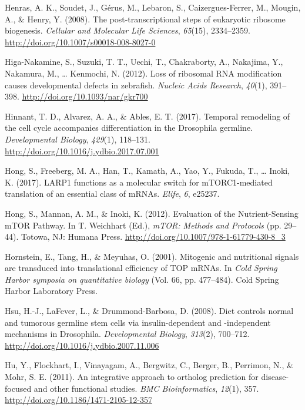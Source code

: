 \documentclass[12pt,twoside]{reedthesis}
\newlength{\cslhangindent}
\newenvironment{cslreferences}%
  {\setlength{\parindent}{0pt}%
  \everypar{\setlength{\hangindent}{\cslhangindent}}\ignorespaces}%
  {\par}
\begin{document}
\begin{cslreferences}
\leavevmode\hypertarget{ref-Henras2008c}{}%
Henras, A. K., Soudet, J., Gérus, M., Lebaron, S., Caizergues-Ferrer, M., Mougin, A., \& Henry, Y. (2008). The post-transcriptional steps of eukaryotic ribosome biogenesis. \emph{Cellular and Molecular Life Sciences}, \emph{65}(15), 2334--2359. \url{http://doi.org/10.1007/s00018-008-8027-0}

\leavevmode\hypertarget{ref-Higa-Nakamine2012o}{}%
Higa-Nakamine, S., Suzuki, T. T., Uechi, T., Chakraborty, A., Nakajima, Y., Nakamura, M., \ldots{} Kenmochi, N. (2012). Loss of ribosomal RNA modification causes developmental defects in zebrafish. \emph{Nucleic Acids Research}, \emph{40}(1), 391--398. \url{http://doi.org/10.1093/nar/gkr700}

\leavevmode\hypertarget{ref-hinnantTemporalRemodelingCell2017}{}%
Hinnant, T. D., Alvarez, A. A., \& Ables, E. T. (2017). Temporal remodeling of the cell cycle accompanies differentiation in the Drosophila germline. \emph{Developmental Biology}, \emph{429}(1), 118--131. \url{http://doi.org/10.1016/j.ydbio.2017.07.001}

\leavevmode\hypertarget{ref-Hong2017a}{}%
Hong, S., Freeberg, M. A., Han, T., Kamath, A., Yao, Y., Fukuda, T., \ldots{} Inoki, K. (2017). LARP1 functions as a molecular switch for mTORC1-mediated translation of an essential class of mRNAs. \emph{Elife}, \emph{6}, e25237.

\leavevmode\hypertarget{ref-hongEvaluationNutrientSensingMTOR2012}{}%
Hong, S., Mannan, A. M., \& Inoki, K. (2012). Evaluation of the Nutrient-Sensing mTOR Pathway. In T. Weichhart (Ed.), \emph{mTOR: Methods and Protocols} (pp. 29--44). Totowa, NJ: Humana Press. \url{http://doi.org/10.1007/978-1-61779-430-8_3}

\leavevmode\hypertarget{ref-Hornstein2001a}{}%
Hornstein, E., Tang, H., \& Meyuhas, O. (2001). Mitogenic and nutritional signals are transduced into translational efficiency of TOP mRNAs. In \emph{Cold Spring Harbor symposia on quantitative biology} (Vol. 66, pp. 477--484). Cold Spring Harbor Laboratory Press.

\leavevmode\hypertarget{ref-hsuDietControlsNormal2008}{}%
Hsu, H.-J., LaFever, L., \& Drummond-Barbosa, D. (2008). Diet controls normal and tumorous germline stem cells via insulin-dependent and -independent mechanisms in Drosophila. \emph{Developmental Biology}, \emph{313}(2), 700--712. \url{http://doi.org/10.1016/j.ydbio.2007.11.006}

\leavevmode\hypertarget{ref-huIntegrativeApproachOrtholog2011}{}%
Hu, Y., Flockhart, I., Vinayagam, A., Bergwitz, C., Berger, B., Perrimon, N., \& Mohr, S. E. (2011). An integrative approach to ortholog prediction for disease-focused and other functional studies. \emph{BMC Bioinformatics}, \emph{12}(1), 357. \url{http://doi.org/10.1186/1471-2105-12-357}


\end{cslreferences}
\end{document}
